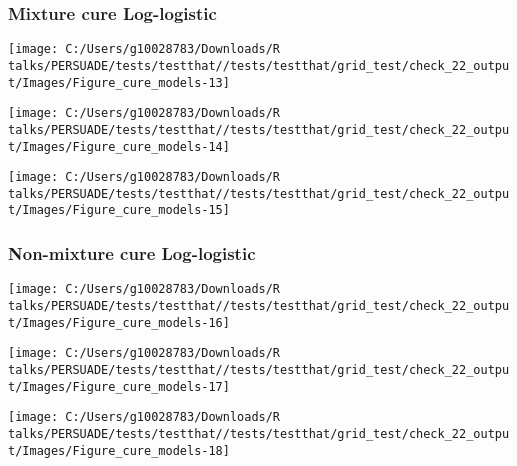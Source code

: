 \documentclass[
]{article}
\begin{document}
\clearpage

\subsubsection{Mixture cure
Log-logistic}\label{mixture-cure-log-logistic}

\begin{flushleft}\texttt{[image: C:/Users/g10028783/Downloads/R talks/PERSUADE/tests/testthat//tests/testthat/grid\_test/check\_22\_output/Images/Figure\_cure\_models-13]} \end{flushleft}

\begin{flushleft}\texttt{[image: C:/Users/g10028783/Downloads/R talks/PERSUADE/tests/testthat//tests/testthat/grid\_test/check\_22\_output/Images/Figure\_cure\_models-14]} \end{flushleft}

\begin{flushleft}\texttt{[image: C:/Users/g10028783/Downloads/R talks/PERSUADE/tests/testthat//tests/testthat/grid\_test/check\_22\_output/Images/Figure\_cure\_models-15]} \end{flushleft}

\clearpage

\subsubsection{Non-mixture cure
Log-logistic}\label{non-mixture-cure-log-logistic}

\begin{flushleft}\texttt{[image: C:/Users/g10028783/Downloads/R talks/PERSUADE/tests/testthat//tests/testthat/grid\_test/check\_22\_output/Images/Figure\_cure\_models-16]} \end{flushleft}

\begin{flushleft}\texttt{[image: C:/Users/g10028783/Downloads/R talks/PERSUADE/tests/testthat//tests/testthat/grid\_test/check\_22\_output/Images/Figure\_cure\_models-17]} \end{flushleft}

\begin{flushleft}\texttt{[image: C:/Users/g10028783/Downloads/R talks/PERSUADE/tests/testthat//tests/testthat/grid\_test/check\_22\_output/Images/Figure\_cure\_models-18]} \end{flushleft}
\end{document}
